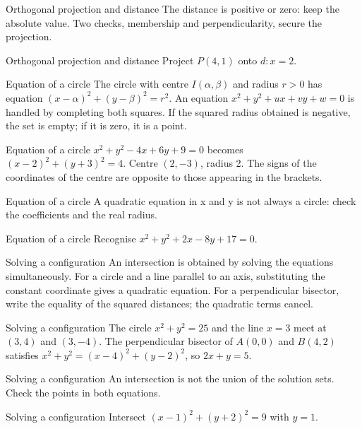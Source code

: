 \documentclass[aspectratio=169,10pt]{beamer}
\begin{document}
\begin{frame}{Orthogonal projection and distance}
The distance is positive or zero: keep the absolute value. Two checks, membership and perpendicularity, secure the projection.
\end{frame}
\begin{frame}{Orthogonal projection and distance}
Project \(P(4,1)\) onto \(d:x=2\).
\end{frame}
\begin{frame}{Equation of a circle}
The circle with centre \(I(\alpha,\beta)\) and radius \(r>0\) has equation \((x-\alpha)^2+(y-\beta)^2=r^2\). An equation \(x^2+y^2+ux+vy+w=0\) is handled by completing both squares. If the squared radius obtained is negative, the set is empty; if it is zero, it is a point.
\end{frame}
\begin{frame}{Equation of a circle}
\(x^2+y^2-4x+6y+9=0\) becomes \((x-2)^2+(y+3)^2=4\). Centre \((2,-3)\), radius 2. The signs of the coordinates of the centre are opposite to those appearing in the brackets.
\end{frame}
\begin{frame}{Equation of a circle}
A quadratic equation in x and y is not always a circle: check the coefficients and the real radius.
\end{frame}
\begin{frame}{Equation of a circle}
Recognise \(x^2+y^2+2x-8y+17=0\).
\end{frame}
\begin{frame}{Solving a configuration}
An intersection is obtained by solving the equations simultaneously. For a circle and a line parallel to an axis, substituting the constant coordinate gives a quadratic equation. For a perpendicular bisector, write the equality of the squared distances; the quadratic terms cancel.
\end{frame}
\begin{frame}{Solving a configuration}
The circle \(x^2+y^2=25\) and the line \(x=3\) meet at \((3,4)\) and \((3,-4)\). The perpendicular bisector of \(A(0,0)\) and \(B(4,2)\) satisfies \(x^2+y^2=(x-4)^2+(y-2)^2\), so \(2x+y=5\).
\end{frame}
\begin{frame}{Solving a configuration}
An intersection is not the union of the solution sets. Check the points in both equations.
\end{frame}
\begin{frame}{Solving a configuration}
Intersect \((x-1)^2+(y+2)^2=9\) with \(y=1\).
\end{frame}
\end{document}

